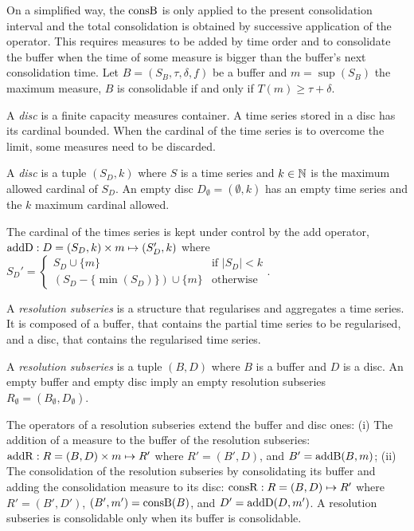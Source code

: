 On a simplified way, the $\operatorname{consB}$ is only applied to the present
consolidation interval and the total consolidation is obtained by
successive application of the operator. This requires measures to be
added by time order and to consolidate the buffer when the time of
some measure is bigger than the buffer's next consolidation time.  Let
$B=(S_B,\tau,\delta,f)$ be a buffer and $m=\sup(S_B)$ the maximum
measure, $B$ is consolidable if and only if $T(m) \geq
\tau+\delta$.


A \emph{disc} is a finite capacity measures container. A time series
stored in a disc has its cardinal bounded. When the cardinal of the
time series is to overcome the limit, some measures need to be
discarded.
\begin{definition}%
  A \emph{disc} is a tuple $(S_D,k)$ where $S$ is a time series and
  $k\in\mathbb{N}$ is the maximum allowed cardinal of $S_D$.  An empty
  disc $D_{\emptyset} = (\emptyset,k)$ has an empty time series and
  the $k$ maximum cardinal allowed.
\end{definition}

The cardinal of the times series is kept under control by the add
operator, $\operatorname{addD} : D=(S_D,k)\times m\mapsto (S'_D,k)$ where %
$
 S_D' = \begin{cases}
  S_D\cup\{m\}                 & \text{if } |S_D|<k  \\
  (S_D-\{\min(S_D)\}) \cup \{m\} & \text{otherwise}
\end{cases}  
$.


A \emph{resolution subseries} is a structure that regularises and
aggregates a time series. It is composed of a buffer, that contains
the partial time series to be regularised, and a disc, that contains
the regularised time series.
\begin{definition}%
  A \emph{resolution subseries} is a tuple $(B,D)$ where $B$ is a
  buffer and $D$ is a disc.  An empty buffer and empty disc imply an
  empty resolution subseries $R_{\emptyset} =
  (B_{\emptyset},D_{\emptyset})$.
\end{definition}
 
The operators of a resolution subseries extend the buffer and disc
ones: (i) The addition of a measure to the buffer of the resolution
subseries: $\operatorname{addR} : R=(B,D) \times m \mapsto R'$ where $R'= (B',D)$,
and $B'= \operatorname{addB}(B,m)$; (ii) The consolidation of the resolution
subseries by consolidating its buffer and adding the consolidation
measure to its disc: $\operatorname{consR} : R=(B,D) \mapsto R'$ where $R'=
(B',D')$, $(B',m') = \operatorname{consB}(B)$, and $D'= \operatorname{addD}(D,m')$.  A resolution
subseries is consolidable only when its buffer is consolidable.




